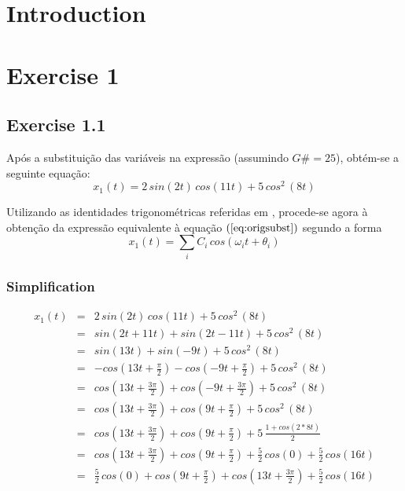 \documentclass[a4paper]{article}
\title{\documentTitle}
\author{\documentAuthors}
\begin{document}
\maketitle
\cleardoublepage

\tableofcontents
\cleardoublepage

\setlength{\parindent}{1cm}
\setlength{\parskip}{0.3cm}

\section{Introduction}

\clearpage

\section{Exercise 1}
\subsection{Exercise 1.1}
Após a substituição das variáveis na expressão (assumindo $G\# = 25$), obtém-se a seguinte equação:
\begin{equation}
	x_{1}(t) = 2 \, sin(2 t) \, cos(11 t) + 5 \, cos^2 \, (8t)
	\label{eq:origsubst}
\end{equation}

\noindent Utilizando as identidades trigonométricas referidas em \emph{}, procede-se agora à obtenção da expressão equivalente à equação $(\ref{eq:origsubst})$ segundo a forma
\begin{equation}
x_{1}(t) = \sum_{i} C_{i} \, cos(\omega_{i} t + \theta_{i})
\end{equation}

\subsubsection{Simplification}
\begin{eqnarray}
\label{eq:simplification}
x_{1}(t) & = & 2 \, sin(2 t) \, cos(11 t) + 5 \, cos^2 \, (8t) \\
	 & = & sin(2 t + 11 t) + sin(2 t - 11 t) + 5 \, cos^2 \, (8t) \\
	 & = & sin(13 t) + sin(- 9 t) + 5 \, cos^2 \, (8t) \\
	 & = & - cos(13 t + \frac{\pi}{2}) - cos(- 9 t + \frac{\pi}{2}) + 5 \, cos^2 \, (8t) \\
	 & = & cos(13 t + \frac{3 \pi}{2}) + cos(- 9 t + \frac{3 \pi}{2}) + 5 \, cos^2 \, (8t) \\
	 & = & cos(13 t + \frac{3 \pi}{2}) + cos(9 t + \frac{\pi}{2}) + 5 \, cos^2 \, (8t) \\
	 & = & cos(13 t + \frac{3 \pi}{2}) + cos(9 t + \frac{\pi}{2}) + 5 \, \frac{1 + cos(2 * 8 t)}{2} \\
	 & = & cos(13 t + \frac{3 \pi}{2}) + cos(9 t + \frac{\pi}{2}) + \frac{5}{2} \, cos(0) + \frac{5}{2} \, cos(16 t) \\
	 & = & \frac{5}{2} \, cos(0) + cos(9 t + \frac{\pi}{2}) + cos(13 t + \frac{3 \pi}{2}) + \frac{5}{2} \, cos(16 t)
\end{eqnarray}
\end{document}
